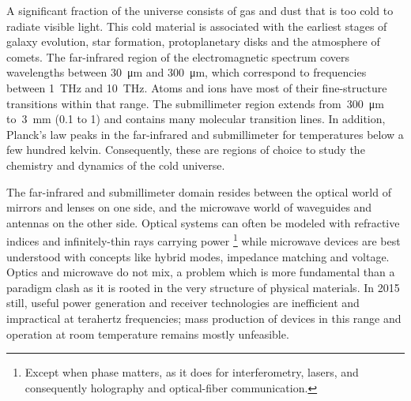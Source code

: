 A significant fraction of the universe consists of gas and dust that is too cold to radiate visible light.
This cold material is associated with the earliest stages of galaxy evolution, star formation, protoplanetary disks and the atmosphere of comets.
%
The far-infrared region of the electromagnetic spectrum covers wavelengths
between \SI{30}{\micro\meter} and \SI{300}{\micro\meter},
which correspond to frequencies
between \SI{1}{\tera\hertz} and \SI{10}{\tera\hertz}.
Atoms and ions have most of their fine-structure transitions within that range.
%
The submillimeter region extends from~\SI{300}{\micro\meter} to~\SI{3}{\milli\meter} (\num{0.1} to \SI{1}{\terahertz}) and contains many molecular transition lines.
%
In addition, Planck's law peaks in the far-infrared and submillimeter for temperatures below a few hundred kelvin.
%
Consequently, these are regions of choice to study the chemistry and dynamics of the cold universe.


The far-infrared and submillimeter domain resides between
the optical world of mirrors and lenses on one side,
and the microwave world of waveguides and antennas on the other side.
Optical systems can often be modeled with refractive indices and infinitely-thin rays carrying power%
\footnote{
    Except when phase matters, as it does for interferometry,
    lasers, and consequently holography and optical-fiber communication.
}
while microwave devices are best understood with concepts like hybrid modes, impedance matching and voltage.
Optics and microwave do not mix,
a problem which is more fundamental than a paradigm clash as it is rooted in the very structure of physical materials.
In 2015 still, useful power generation and receiver technologies are inefficient and impractical at terahertz frequencies;
mass production of devices in this range and operation at room temperature remains mostly unfeasible.

